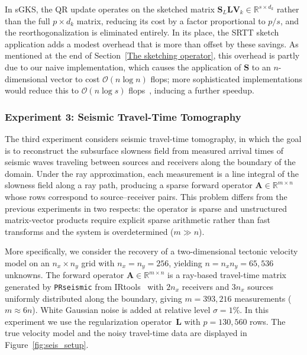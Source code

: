 \documentclass[%
  a4paper,
  onecolumn,
  colorlinks,
]{preprint}
\theoremstyle{plain}
\theoremstyle{definition}
\newcommand{\R}{\ensuremath{\mathbb{R}}}
\newcommand{\bA}{\ensuremath{\boldsymbol{A}}}
\newcommand{\bL}{\ensuremath{\boldsymbol{L}}}
\newcommand{\bS}{\ensuremath{\boldsymbol{S}}}
\newcommand{\bV}{\ensuremath{\boldsymbol{V}}}
\begin{document}
In sGKS, the QR update operates on the sketched matrix $\bS_L \bL \bV_k \in 
\R^{s \times d_k}$ rather than the full $p \times d_k$ matrix, reducing its cost by a factor proportional to $p / s$, and the reorthogonalization is      
  eliminated entirely. In its place, the SRTT sketch application adds a modest 
  overhead that is more than offset by these savings. As mentioned at the end of
   Section~\ref{The sketching operator}, this overhead is partly due to our
  naive implementation, which causes the application of $\bS$ to an
  $n$-dimensional vector to cost $\mathcal{O}(n\log n)$ flops; more
  sophisticated implementations would reduce this to $\mathcal{O}(n\log s)$
  flops~\cite{WOOLFEetal2008}, inducing a further speedup.

 
\subsubsection{Experiment 3: Seismic Travel-Time Tomography}\label{sec:seismic}

The third experiment considers seismic travel-time tomography, in which
the goal is to reconstruct the subsurface slowness field from measured
arrival times of seismic waves traveling between sources and receivers
along the boundary of the domain.
Under the ray approximation, each measurement is a line integral of the
slowness field along a ray path, producing a sparse forward operator
$\bA \in \R^{m \times n}$ whose rows correspond to source--receiver
pairs.
This problem differs from the previous experiments in two respects:
the operator is sparse and unstructured matrix-vector products
require explicit sparse arithmetic rather than fast transforms and
the system is overdetermined ($m \gg n$).

More specifically, we consider the recovery of a two-dimensional tectonic velocity model
on an $n_x \times n_y$ grid with $n_x = n_y = 256$, yielding
$n = n_x n_y = 65{,}536$ unknowns.
The forward operator
$\bA \in \R^{m \times n}$ is a ray-based travel-time matrix generated
by \texttt{PRseismic} from IRtools~\cite{GazzolaNagyPer19} with
$2n_x$ receivers and $3n_x$ sources uniformly distributed along the
boundary, giving $m = 393{,}216$ measurements ($m \approx 6n$).
White Gaussian noise is added at relative level $\sigma = 1\%$.
In this experiment we use the regularization operator~$\bL$ with
$p = 130{,}560$ rows.
The true velocity model and the noisy travel-time data are displayed
in Figure~\ref{fig:seis_setup}.
\end{document}
